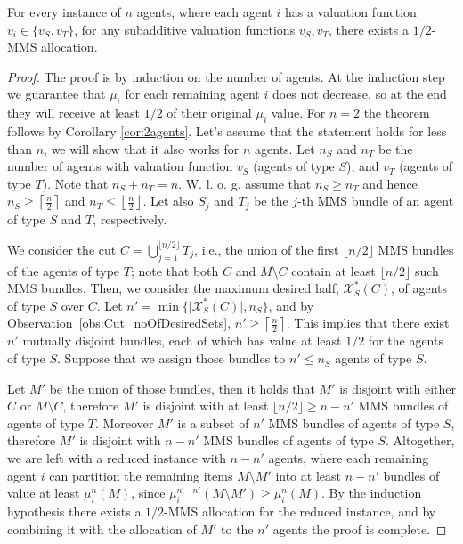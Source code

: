 \begin{theorem}\label{thm:two-types}
    For every instance of $n$ agents, where each agent $i$ has a valuation function  $v_i \in \{v_S,v_T\}$, for any subadditive valuation functions $v_S,v_T$, there exists a $1/2$-MMS allocation.
\end{theorem}
\begin{proof}

   
    The proof is by induction on the number of agents. At the induction step we guarantee that $\mu_i$ for each remaining agent $i$ does not decrease, so at the end they will receive at least $1/2$ of their original $\mu_i$ value. For $n=2$ the theorem follows by Corollary \ref{cor:2agents}. 
    Let's assume that the statement holds for less than $n$, we will show that it also works for $n$ agents. Let $n_S$ and $n_T$ be the number of agents with valuation function $v_S$ (agents of type $S$), and $v_T$ (agents of type $T$). Note that $n_S + n_T = n$.  W. l. o. g. assume that $n_S\ge n_T$ and hence $n_S \ge \left\lceil \frac{n}{2}\right\rceil$ and $n_T \le \left\lfloor \frac{n}{2}\right\rfloor$. Let also $S_j$ and $T_j$ be the $j$-th MMS bundle of an agent of type $S$ and $T$, respectively.
    
    We consider the cut $C=\bigcup_{j=1}^{\lfloor n/2\rfloor}T_j$, i.e., the union of the first $\lfloor n/2\rfloor$ MMS bundles of the agents of type $T$; note that both $C$ and $M\setminus C$ contain at least $\lfloor n/2\rfloor$ such MMS bundles.
    Then, we consider the maximum desired half, $\mathcal{X}_{S}^{*}(C)$, of agents of type $S$ over $C$. 
    Let $n'=\min\{\lvert \mathcal{X}_{S}^{*}(C) \rvert,n_S\}$, and by Observation~\ref{obs:Cut_noOfDesiredSets}, $n' \ge \left\lceil\frac{n}{2}\right\rceil$. This implies that there exist $n'$ mutually disjoint bundles, each of which has value at least $1/2$ for the agents of type $S$. Suppose that we assign those bundles to $n'\leq n_S$ agents of type $S$. 
    
    Let $M'$ be the union of those bundles, then it holds that $M'$ is disjoint with either $C$ or $M\setminus C$,  therefore $M'$ is disjoint with at least $\lfloor n/2\rfloor \geq n-n'$ MMS bundles of agents of type $T$. Moreover $M'$ is a subset of $n'$ MMS bundles of agents of type $S$, therefore $M'$ is disjoint with $n-n'$ MMS bundles of agents of type $S$. Altogether,  we are left with a reduced instance with $n-n'$ agents, where each remaining agent $i$  can partition the remaining items $M\setminus M'$ into at least $n-n'$ bundles of value at least $\mu_i^n(M)$, since $\mu_i^{n-n'}(M\setminus M')\geq \mu_i^n(M)$.  By the induction hypothesis there exists a $1/2$-MMS allocation for the reduced instance, and by combining it with the allocation of $M'$ to the $n'$ agents the proof is complete.
\end{proof}